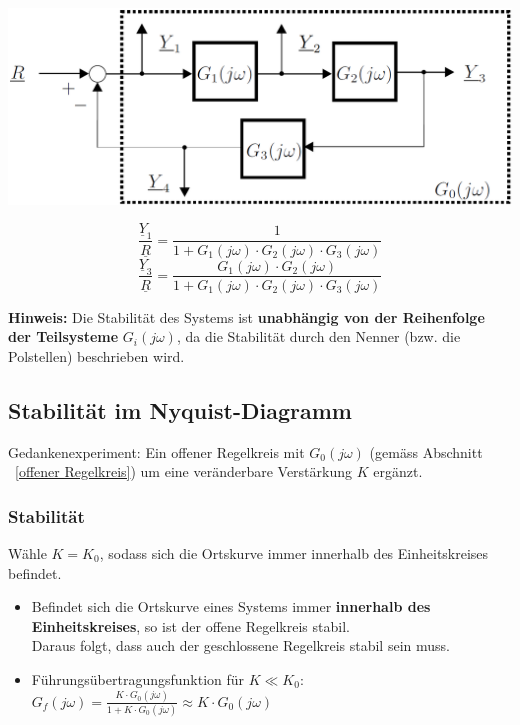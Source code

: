 \begin{minipage}[c]{0.5\columnwidth}
    \includegraphics[width=\columnwidth]{images/kreisschaltung_mehrere_bloecke.png}
\end{minipage}
\hfill
\begin{minipage}[c]{0.48\columnwidth}
    $$ \frac{\underline{Y}_1}{\underline{R}} = \frac{1}{1 + G_1(j \omega) \cdot G_2(j \omega) \cdot G_3(j \omega)} $$
    $$ \frac{\underline{Y}_3}{\underline{R}} = \frac{G_1(j \omega) \cdot G_2(j \omega)}{1 + G_1(j \omega) \cdot G_2(j \omega) \cdot G_3(j \omega)} $$
\end{minipage}

\vspace{0.2cm}
\textbf{Hinweis:} Die Stabilität des Systems ist \textbf{unabhängig von der Reihenfolge der Teilsysteme} $G_{i}(j \omega)$,
da die Stabilität durch den Nenner (bzw. die Polstellen) beschrieben wird.


\subsection{Stabilität im Nyquist-Diagramm}

Gedankenexperiment: Ein offener Regelkreis mit $G_0(j \omega)$ (gemäss Abschnitt ~\ref{offener Regelkreis}) um eine 
veränderbare Verstärkung $K$ ergänzt.


\subsubsection{Stabilität}

Wähle $K = K_0$, sodass sich die Ortskurve immer innerhalb des Einheitskreises befindet.
\vspace{0.1cm}
\begin{itemize}
    \item Befindet sich die Ortskurve eines Systems immer \textbf{innerhalb des Einheitskreises}, so ist der offene Regelkreis stabil. \\
        \textrightarrow Daraus folgt, dass auch der geschlossene Regelkreis stabil sein muss.
    \item Führungsübertragungsfunktion für $K \ll K_0$:\\
    $G_f(j \omega) = \frac{K \cdot G_0(j \omega)}{1 + K \cdot G_0(j \omega)} \approx K \cdot G_0(j \omega)$ 
\end{itemize}


